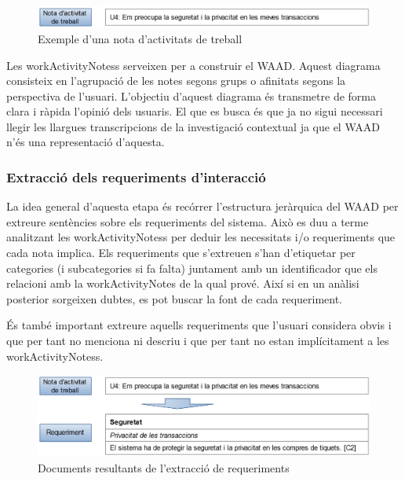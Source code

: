 \begin{figure}[htp]
\centering
\includegraphics[scale=0.3]{WorkActivityNotes1.png}
\caption{Exemple d'una nota d'activitats de treball}\label{fig:workActivityNote1}
\end{figure}

Les \glspl{workActivityNotes} serveixen per a construir el \ac{WAAD}. Aquest diagrama consisteix en l'agrupació de les notes segons grups o afinitats segons la perspectiva de l'usuari. L'objectiu d'aquest diagrama és transmetre de forma clara i ràpida l'opinió dels usuaris. El que es busca és que ja no sigui necessari llegir les llargues transcripcions de la investigació contextual ja que el \ac{WAAD} n'és una representació d'aquesta. 

\subsubsection{Extracció dels requeriments d'interacció}\label{subsubsec:Extraccio_requeriments}
La idea general d'aquesta etapa és recórrer l'estructura jeràrquica del \ac{WAAD} per extreure sentències sobre els requeriments del sistema. Això es duu a terme analitzant les \glspl{workActivityNotes} per deduir les necessitats i/o requeriments que cada nota implica. Els requeriments que s'extreuen s'han d'etiquetar per categories (i subcategories si fa falta) juntament amb un identificador que els relacioni amb la \gls{workActivityNotes} de la qual prové. Així si en un anàlisi posterior sorgeixen dubtes, es pot buscar la font de cada requeriment. 

És també important extreure aquells requeriments que l'usuari considera obvis i que per tant no menciona ni descriu i que per tant no estan implícitament a les \glspl{workActivityNotes}.

\begin{figure}[htp]
\centering
\includegraphics[scale=0.3]{WorkActivityNotes2.png}
\caption{Documents resultants de l'extracció de requeriments}\label{fig:workActivityNote2}
\end{figure}

